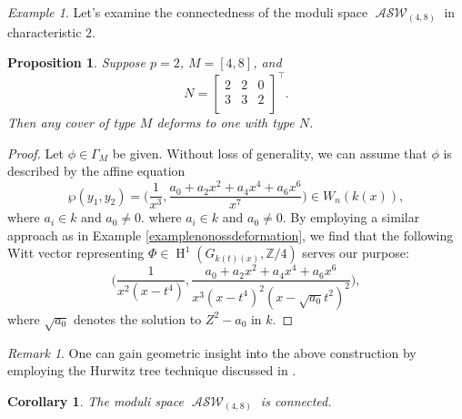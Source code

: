 \documentclass{compositio}
\newtheorem{proposition}[theorem]{Proposition}
\newtheorem{corollary}[theorem]{Corollary}
\theoremstyle{remark}
\newtheorem{example}[theorem]{Example}
\theoremstyle{remark}
\newtheorem{remark}[theorem]{Remark}
\DeclareMathOperator{\ASW}{\mathcal{ASW}}
\DeclareMathOperator{\cohom}{H}
\begin{document}
\begin{example}
Let's examine the connectedness of the moduli space $\ASW_{(4,8)}$ in characteristic $2$.

\begin{proposition}
\label{propnontrivialdef}
    Suppose $p=2$, $M=[4,8]$, and 
    \begin{equation*}
        N=\begin{bmatrix}
        2 & 2 & 0 \\
        3 & 3 & 2 \\
        \end{bmatrix}^{\top}.
    \end{equation*}
    Then any cover of type $M$ deforms to one with type $N$.
\end{proposition}

\begin{proof}
Let $\phi \in \Gamma_M$ be given. Without loss of generality, we can assume that $\phi$ is described by the affine equation
\begin{equation*}
    \wp(y_1, y_2)=\bigg( \frac{1}{x^3}, \frac{a_0+a_2x^2+a_4x^4+a_6x^6}{x^7} \bigg) \in W_n(k(x)),
\end{equation*}
where $a_i \in k$ and $a_0 \neq 0$. where $a_i \in k$ and $a_0 \neq 0$. By employing a similar approach as in Example \ref{examplenonossdeformation}, we find that the following Witt vector representing $\Phi \in \cohom^1(G_{k(t)(x)}, \mathbb{Z}/4)$ serves our purpose:
\begin{equation*}
    \bigg( \frac{1}{x^2(x-t^4)}, \frac{a_0+a_2x^2+a_4x^4+a_6x^6}{x^3(x-t^4)^2(x-\sqrt{a_0}t^2)^2} \bigg),
\end{equation*}
where $\sqrt{a_0}$ denotes the solution to $Z^2-a_0$ in $k$.
\end{proof}

\begin{remark}
    One can gain geometric insight into the above construction by employing the Hurwitz tree technique discussed in \cite{2020arXiv201013614D}. 
\end{remark}


\begin{corollary}
    The moduli space $\ASW_{(4,8)}$ is connected. 
\end{corollary}


\end{example}
\end{document}

